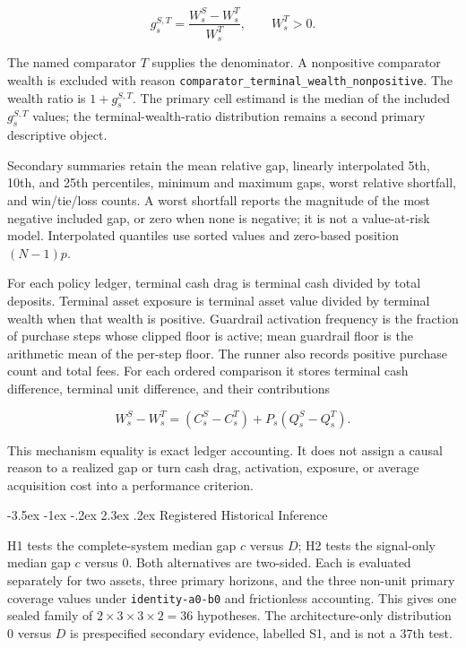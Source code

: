 \documentclass[12pt,a4paper,oneside]{report}
\makeatletter
\renewcommand\section{\@startsection{section}{1}{\z@}%
  {-3.5ex \@plus -1ex \@minus -.2ex}%
  {2.3ex \@plus .2ex}%
  {\normalfont\fontsize{14}{17}\selectfont\bfseries}}
\makeatother
\begin{document}
\begin{equation}
  g_s^{S,T}=\frac{W_s^S-W_s^T}{W_s^T},
  \qquad W_s^T>0.
  \label{eq:method-relative-gap}
\end{equation}

The named comparator $T$ supplies the denominator. A nonpositive comparator
wealth is excluded with reason
\texttt{comparator\_terminal\_wealth\_nonpositive}. The wealth ratio is
$1+g_s^{S,T}$. The primary cell estimand is the median of the included
$g_s^{S,T}$ values; the terminal-wealth-ratio distribution remains a second
primary descriptive object.

Secondary summaries retain the mean relative gap, linearly interpolated 5th,
10th, and 25th percentiles, minimum and maximum gaps, worst relative
shortfall, and win/tie/loss counts. A worst shortfall reports the magnitude of
the most negative included gap, or zero when none is negative; it is not a
value-at-risk model. Interpolated quantiles use sorted values and zero-based
position $(N-1)p$.

For each policy ledger, terminal cash drag is terminal cash divided by total
deposits. Terminal asset exposure is terminal asset value divided by terminal
wealth when that wealth is positive. Guardrail activation frequency is the
fraction of purchase steps whose clipped floor is active; mean guardrail floor
is the arithmetic mean of the per-step floor. The runner also records positive
purchase count and total fees. For each ordered comparison it stores terminal
cash difference, terminal unit difference, and their contributions

\begin{equation}
  W_s^S-W_s^T
  =\left(C_s^S-C_s^T\right)
   +P_s\left(Q_s^S-Q_s^T\right).
  \label{eq:method-terminal-attribution}
\end{equation}

This mechanism equality is exact ledger accounting. It does not assign a
causal reason to a realized gap or turn cash drag, activation, exposure, or
average acquisition cost into a performance criterion.

\section{Registered Historical Inference}
\label{sec:method-inference}

H1 tests the complete-system median gap $c$ versus $D$; H2 tests the
signal-only median gap $c$ versus $0$. Both alternatives are two-sided. Each
is evaluated separately for two assets, three primary horizons, and the three
non-unit primary coverage values under \texttt{identity-a0-b0} and
frictionless accounting. This gives one sealed family of
$2\times3\times3\times2=36$ hypotheses. The architecture-only distribution
$0$ versus $D$ is prespecified secondary evidence, labelled S1, and is not a
37th test.
\end{document}
